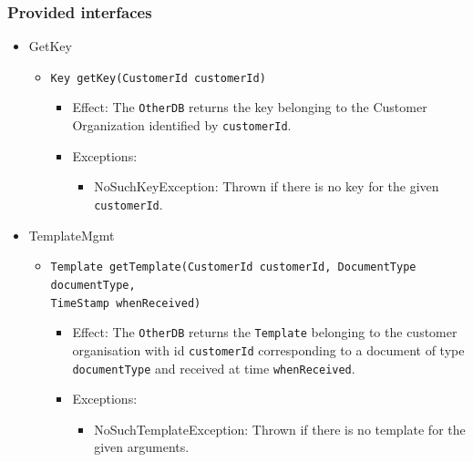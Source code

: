 \documentclass[a4paper,10pt]{article}
\begin{document}
\subsubsection*{Provided interfaces}
\begin{itemize}
        \item GetKey
    \begin{itemize}
        \item \texttt{Key getKey(CustomerId customerId)}
        \begin{itemize}
            \item Effect: The \texttt{OtherDB} returns the key belonging to the Customer Organization identified by \texttt{customerId}.
            \item Exceptions:
            \begin{itemize}
                \item NoSuchKeyException: Thrown if there is no key for the given \texttt{customerId}.
            \end{itemize}
        \end{itemize}
    \end{itemize}
    
    \item TemplateMgmt
    \begin{itemize}
        \item \texttt{Template getTemplate(CustomerId customerId, DocumentType documentType, \\ TimeStamp whenReceived)}
        \begin{itemize}
            \item Effect: The \texttt{OtherDB} returns the \texttt{Template} belonging to the customer organisation with id \texttt{customerId} corresponding to a document of type \texttt{documentType} and received at time \texttt{whenReceived}. 
            \item Exceptions:
            \begin{itemize}
                \item NoSuchTemplateException: Thrown if there is no template for the given arguments.
            \end{itemize}
        \end{itemize}
        

\end{itemize}
\end{itemize}
\end{document}
